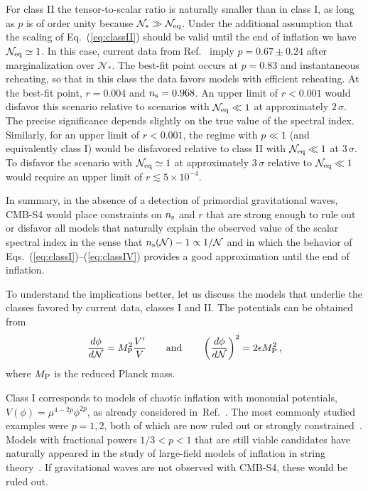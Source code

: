 For class II the tensor-to-scalar ratio is naturally smaller than in class I, as long as $p$ is of order unity because $\mathcal{N}_\ast\gg\mathcal{N}_{\rm eq}$. Under the additional assumption that the scaling of Eq.~(\ref{eq:classII}) should be valid until the end of inflation we have $\mathcal{N}_{\rm eq}\simeq 1$. In this case, current data from Ref.~\cite{Ade:2015tva} imply $p=0.67\pm0.24$ after marginalization over $\mathcal{N}_\ast$. The best-fit point occurs at $p=0.83$ and instantaneous reheating, so that in this class the data favors models with efficient reheating. At the best-fit point, $r=0.004$ and $n_{\rm s}=0.968$. An upper limit of $r<0.001$ would disfavor this scenario relative to scenarios with $\mathcal{N}_{\rm eq}\ll 1$ at approximately $2\,\sigma$. The precise significance depends slightly on the true value of the spectral index. Similarly, for an upper limit of $r<0.001$, the regime with $p\ll1$ (and equivalently class I) would be disfavored relative to class II with $\mathcal{N}_{\rm eq}\ll 1$ at $3\,\sigma$. To disfavor the scenario with $\mathcal{N}_{\rm eq}\simeq 1$ at approximately $3\,\sigma$ relative to $\mathcal{N}_{\rm eq}\ll 1$ would require an upper limit of $r\lesssim 5\times 10^{-4}$.  

In summary, in the absence of a detection of primordial gravitational waves, CMB-S4 would place constraints on $n_{\rm s}$ and $r$ that are strong enough to rule out or disfavor all models that naturally explain the observed value of the scalar spectral index in the sense that $n_{\rm s}(\mathcal{N})-1\propto 1/\mathcal{N}$ and in which the behavior of Eqs.~(\ref{eq:classI})--(\ref{eq:classIV}) provides a good approximation until the end of inflation. 

To understand the implications better, let us discuss the models that underlie the classes favored by current data, classes I and II. The  potentials can be obtained from 
\begin{equation}
\frac{d\phi}{d\mathcal{N}}=M_{\rm P}^2\frac{V'}{V}\qquad{\rm and}\qquad \left(\frac{d\phi}{d\mathcal{N}}\right)^2=2\epsilon M_{\rm P}^2\,,
\end{equation}
where $M_{\rm P}$ is the reduced Planck mass.

Class I corresponds to models of chaotic inflation with monomial potentials, $V(\phi)=\mu^{4-2p}\phi^{2p}$,
as already considered in~Ref.~\cite{Linde:1983gd}. The most commonly studied examples were $p=1,2$, both of which are now ruled out or strongly constrained~\cite{Ade:2015tva}. Models with fractional powers $1/3<p<1$ that are still viable candidates have naturally appeared in the study of large-field models of inflation in string theory~\cite{Silverstein:2008sg,McAllister:2008hb,Flauger:2009ab}. If gravitational waves are not observed with CMB-S4, these would be ruled out.

